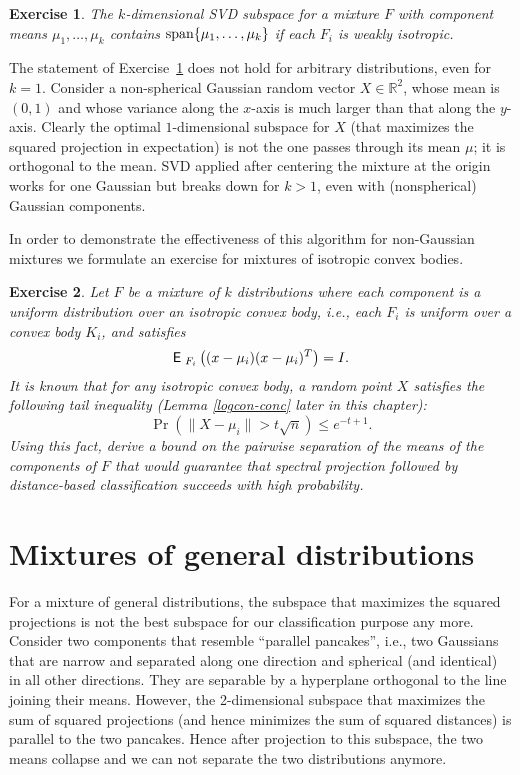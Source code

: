 \documentclass{book}
\newtheorem{exercise}{Exercise}
\numberwithin{exercise}{chapter}
\begin{document}
\begin{exercise}\label{svd.isotropic}
The $k$-dimensional SVD subspace for a mixture $F$ with component means $\mu_1, \ldots, \mu_k$ contains
$\hbox{span}\{\mu_1,\dots,\mu_k\}$ if each $F_i$ is weakly isotropic.
\end{exercise}

The statement of Exercise~\ref{svd.isotropic} does not hold for arbitrary distributions, even for $k=1$. Consider a non-spherical Gaussian random vector $X\in\mathbb R^2$, whose mean is $(0,1)$ and whose variance along the $x$-axis is much larger than that along the $y$-axis. Clearly the optimal $1$-dimensional subspace for $X$ (that maximizes the squared projection in expectation) is not the one passes through its mean $\mu$; it is orthogonal to the mean. SVD applied after centering the mixture at the origin works for one Gaussian but breaks down for $k > 1$, even with (nonspherical) Gaussian components.


In order to demonstrate the effectiveness of this algorithm for non-Gaussian mixtures we formulate an exercise for mixtures of
isotropic convex bodies.
\begin{exercise}
Let $F$ be a mixture of $k$ distributions where each component is a uniform distribution over an isotropic convex body,
i.e., each $F_i$ is uniform over a convex body $K_i$, and satisfies
\[
\hbox{{\sf E}\;}_{F_i} \left((x-\mu_i)(x-\mu_i)^T\right) = I.
\]
It is known that for any isotropic convex body, a random point $X$ satisfies the following tail inequality (Lemma \ref{logcon-conc} later
in this chapter):
\[
\Pr(\|X-\mu_i\| > t\sqrt{n}) \le e^{-t+1}.
\]
Using this fact, derive a bound on the pairwise separation of the means of the components of $F$ that would guarantee
that spectral projection followed by distance-based classification succeeds with high probability.
\end{exercise}

\section{Mixtures of general distributions}\label{sec:genmix}
For a mixture of general distributions, the subspace that maximizes the squared projections is not the best subspace for our classification purpose any more. Consider two components that resemble ``parallel pancakes'', i.e., two Gaussians that are narrow and separated along one direction and spherical (and identical) in all other directions. They are separable by a hyperplane orthogonal to the line joining their means. However, the 2-dimensional subspace that maximizes the sum of squared projections (and hence minimizes the sum of squared distances)
is parallel to the two pancakes. Hence after projection to this subspace, the two means collapse and we can not separate
the two distributions anymore.
\end{document}
